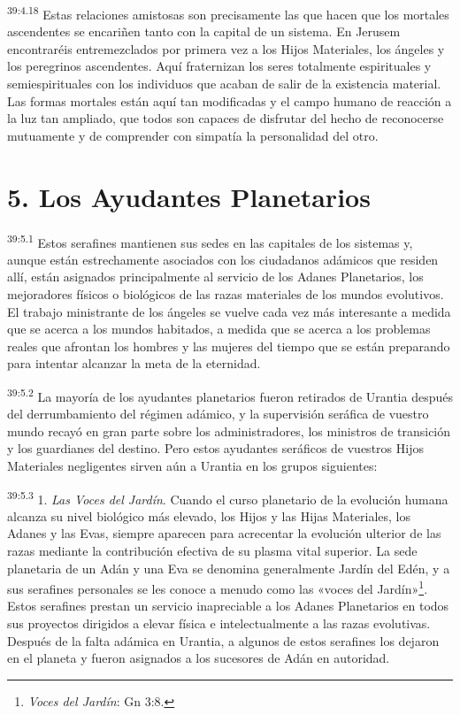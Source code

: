 \par
\textsuperscript{39:4.18} Estas relaciones amistosas son precisamente las que hacen que los mortales ascendentes se encariñen tanto con la capital de un sistema. En Jerusem encontraréis entremezclados por primera vez a los Hijos Materiales, los ángeles y los peregrinos ascendentes. Aquí fraternizan los seres totalmente espirituales y semiespirituales con los individuos que acaban de salir de la existencia material. Las formas mortales están aquí tan modificadas y el campo humano de reacción a la luz tan ampliado, que todos son capaces de disfrutar del hecho de reconocerse mutuamente y de comprender con simpatía la personalidad del otro.

\section*{5. Los Ayudantes Planetarios}
\par
\textsuperscript{39:5.1} Estos serafines mantienen sus sedes en las capitales de los sistemas y, aunque están estrechamente asociados con los ciudadanos adámicos que residen allí, están asignados principalmente al servicio de los Adanes Planetarios, los mejoradores físicos o biológicos de las razas materiales de los mundos evolutivos. El trabajo ministrante de los ángeles se vuelve cada vez más interesante a medida que se acerca a los mundos habitados, a medida que se acerca a los problemas reales que afrontan los hombres y las mujeres del tiempo que se están preparando para intentar alcanzar la meta de la eternidad.

\par
\textsuperscript{39:5.2} La mayoría de los ayudantes planetarios fueron retirados de Urantia después del derrumbamiento del régimen adámico, y la supervisión seráfica de vuestro mundo recayó en gran parte sobre los administradores, los ministros de transición y los guardianes del destino. Pero estos ayudantes seráficos de vuestros Hijos Materiales negligentes sirven aún a Urantia en los grupos siguientes:

\par
\textsuperscript{39:5.3} 1. \textit{Las Voces del Jardín}. Cuando el curso planetario de la evolución humana alcanza su nivel biológico más elevado, los Hijos y las Hijas Materiales, los Adanes y las Evas, siempre aparecen para acrecentar la evolución ulterior de las razas mediante la contribución efectiva de su plasma vital superior. La sede planetaria de un Adán y una Eva se denomina generalmente Jardín del Edén, y a sus serafines personales se les conoce a menudo como las «voces del Jardín»\footnote{\textit{Voces del Jardín}: Gn 3:8.}. Estos serafines prestan un servicio inapreciable a los Adanes Planetarios en todos sus proyectos dirigidos a elevar física e intelectualmente a las razas evolutivas. Después de la falta adámica en Urantia, a algunos de estos serafines los dejaron en el planeta y fueron asignados a los sucesores de Adán en autoridad.


